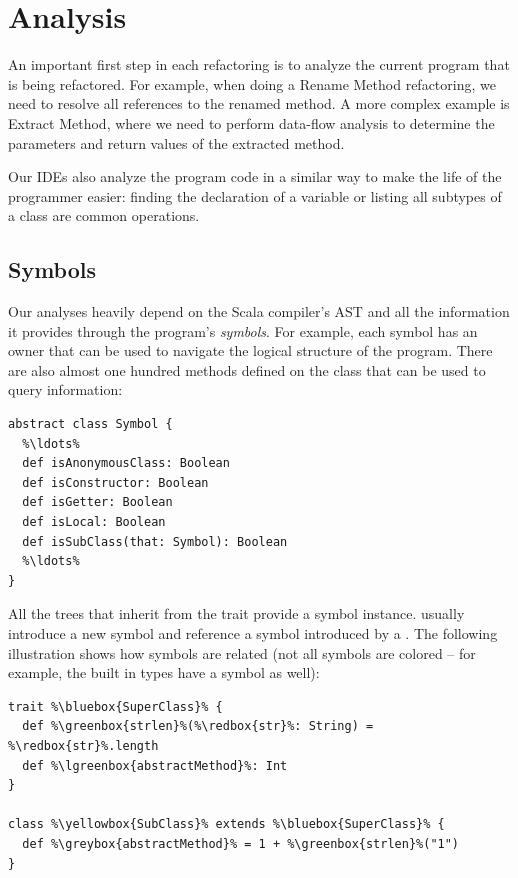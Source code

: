 \newpage
\section{Analysis} \label{section:analysis}

An important first step in each refactoring is to analyze the current program that is being refactored. For example, when doing a Rename Method refactoring, we need to resolve all references to the renamed method. A more complex example is Extract Method, where we need to perform data-flow analysis to determine the parameters and return values of the extracted method.

Our IDEs also analyze the program code in a similar way to make the life of the programmer easier: finding the declaration of a variable or listing all subtypes of a class are common operations.

\subsection{Symbols}

Our analyses heavily depend on the Scala compiler's AST and all the information it provides through the program's \textit{symbols}. For example, each symbol has an owner that can be used to navigate the logical structure of the program. There are also almost one hundred  methods defined on the  class that can be used to query information:
\begin{lstlisting}
abstract class Symbol {
  %\ldots%
  def isAnonymousClass: Boolean
  def isConstructor: Boolean
  def isGetter: Boolean
  def isLocal: Boolean
  def isSubClass(that: Symbol): Boolean
  %\ldots%
}
\end{lstlisting}

All the trees that inherit from the  trait provide a symbol instance.  usually introduce a new symbol and  reference a symbol introduced by a . The following illustration shows how symbols are related (not all symbols are colored -- for example, the built in types have a symbol as well):

\begin{lstlisting}
trait %\bluebox{SuperClass}% {
  def %\greenbox{strlen}%(%\redbox{str}%: String) = %\redbox{str}%.length
  def %\lgreenbox{abstractMethod}%: Int
}

class %\yellowbox{SubClass}% extends %\bluebox{SuperClass}% {
  def %\greybox{abstractMethod}% = 1 + %\greenbox{strlen}%("1")
}
\end{lstlisting}

